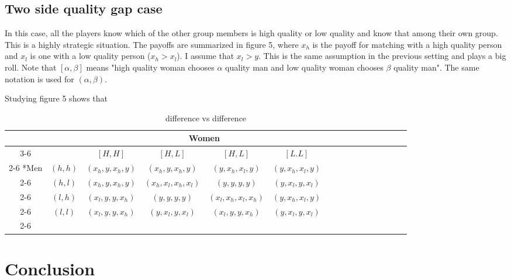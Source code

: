 \documentclass{article}
\begin{document}
	\subsection{Two side quality gap case}
	In this case, all the players know which of the other group members is high quality or low quality and know that among their own group. This is a highly strategic situation. The payoffs are summarized in figure 5, where $x_h$ is the payoff for matching with a high quality person and $x_l$ is one with a low quality person ($x_h > x_l$). I assume that $x_l > y$. This is the same assumption in the previous setting and plays a big roll. Note that $[\alpha, \beta]$ means "high quality woman chooses $\alpha$ quality man and low quality woman chooses $\beta$ quality man". The same notation is used for $(\alpha, \beta)$.
	\par
	Studying figure 5 shows that 
	\begin{table}[h]
	\begin{center}
                \setlength{\extrarowheight}{2pt}
                \begin{tabular}{*{16}{c|}}
                  \multicolumn{2}{c}{} & \multicolumn{1}{c}{} & \multicolumn{2}{c}{Women}\\\cline{3-6}
                  \multicolumn{1}{c}{} &  & $[H, H]$  & $[H, L]$ & $[H, L]$ & $[L.L]$\\\cline{2-6}
                  \multirow{4}*{Men}  & $(h,h)$ & $(x_h,y,x_h,y)$ & $(x_h,y,x_h,y)$ & $(y,x_h,x_l,y)$ & $(y,x_h,x_l,y)$\\\cline{2-6}
                  & $(h,l)$ & $(x_h,y,x_h,y)$ & $(x_h,x_l,x_h,x_l)$ & $(y,y,y,y)$ & $(y,x_l,y,x_l)$\\\cline{2-6}
                  & $(l,h)$ & $(x_l,y,y,x_h)$ & $(y,y,y,y)$ & $(x_l,x_h,x_l,x_h)$ & $(y,x_h,x_l,y)$\\\cline{2-6}
                  & $(l,l)$ & $(x_l,y,y,x_h)$ & $(y,x_l,y,x_l)$ & $(x_l,y,y,x_h)$ & $(y,x_l,y,x_l)$\\\cline{2-6}
                \end{tabular}
        \end{center}
        \caption{difference vs difference}
  	\end{table}




\section{Conclusion}
\end{document}
